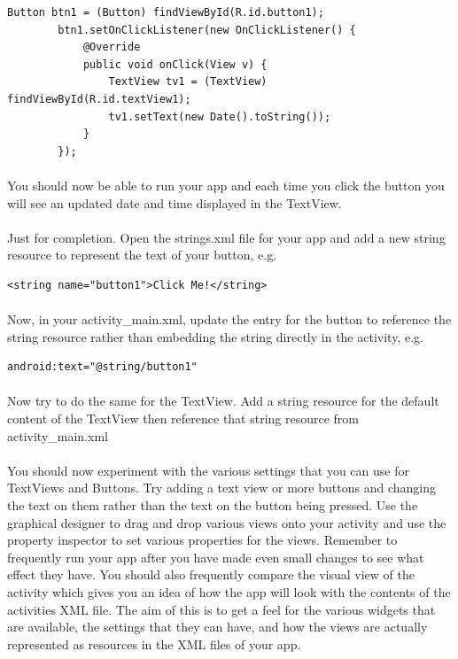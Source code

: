 \begin{lstlisting}
Button btn1 = (Button) findViewById(R.id.button1);
        btn1.setOnClickListener(new OnClickListener() {
            @Override
            public void onClick(View v) {
                TextView tv1 = (TextView) findViewById(R.id.textView1);
                tv1.setText(new Date().toString());
            }
        });
\end{lstlisting}

\paragraph{} You should now be able to run your app and each time you click the button you will see an updated date and time displayed in the TextView.

\paragraph{} Just for completion. Open the strings.xml file for your app and add a new string resource to represent the text of your button, e.g.

\begin{lstlisting}
<string name="button1">Click Me!</string>
\end{lstlisting}

\paragraph{} Now, in your activity\_main.xml, update the entry for the button to reference the string resource rather than embedding the string directly in the activity, e.g.

\begin{lstlisting}
android:text="@string/button1"
\end{lstlisting}

\paragraph{} Now try to do the same for the TextView. Add a string resource for the default content of the TextView then reference that string resource from activity\_main.xml

\paragraph{} You should now experiment with the various settings that you can use for TextViews and Buttons. Try adding a text view or more buttons and changing the text on them rather than the text on the button being pressed. Use the graphical designer to drag and drop various views onto your activity and use the property inspector to set various properties for the views. Remember to frequently run your app after you have made even small changes to see what effect they have. You should also frequently compare the visual view of the activity which gives you an idea of how the app will look with the contents of the activities XML file. The aim of this is to get a feel for the various widgets that are available, the settings that they can have, and how the views are actually represented as resources in the XML files of your app.

